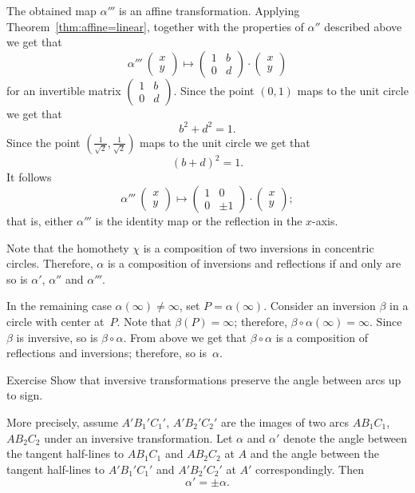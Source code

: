 The obtained map $\alpha'''$ is an affine transformation.
Applying Theorem~\ref{thm:affine=linear}, together with the properties of $\alpha''$ described above we get that
\[\alpha'''\:\left(\begin{smallmatrix}
x\\ y
\end{smallmatrix} \right)
  \mapsto
  \left(\begin{smallmatrix}
1&b\\ 0&d
\end{smallmatrix} \right)
  \cdot
  \left(\begin{smallmatrix}
x\\ y
\end{smallmatrix} \right)
\]
for an invertible matrix $\left(\begin{smallmatrix}
1&b\\ 0&d
\end{smallmatrix} \right)$.
Since the point $(0,1)$ maps to the unit circle we get that 
\[b^2+d^2=1.\]
Since the point $(\tfrac1{\sqrt{2}},\tfrac1{\sqrt{2}})$ maps to the unit circle we get that 
\[(b+d)^2=1.\]
It follows 
\[\alpha'''\:\left(\begin{smallmatrix}
x\\ y
\end{smallmatrix} \right)
  \mapsto
  \left(\begin{smallmatrix}
1&0\\ 0&\pm1
\end{smallmatrix} \right)
\cdot
\left(\begin{smallmatrix}
x
\\ 
y
\end{smallmatrix} \right);
\]
that is, either $\alpha'''$ is the identity map or the reflection in the $x$-axis.

Note that the homothety $\chi$ is a composition of two inversions in concentric circles.
Therefore, $\alpha$ is a composition of inversions and reflections if and only are so is $\alpha'$, $\alpha''$ and $\alpha'''$.

In the remaining case $\alpha(\infty)\ne \infty$, set $P=\alpha(\infty)$.
Consider an inversion $\beta$ in a circle with center at~$P$.
Note that $\beta(P)=\infty$; 
therefore, $\beta\circ\alpha(\infty)=\infty$.
Since $\beta$ is inversive, so is $\beta\circ\alpha$.
From above we get that $\beta\circ\alpha$ is a composition of reflections and inversions;
therefore, so is~$\alpha$.
\qeds

\begin{thm}{Exercise}\label{ex:inversive-angle}
Show that inversive transformations preserve the angle between arcs up to sign.

More precisely, assume $A'B_1'C_1'$, $A'B_2'C_2'$ are the images of two arcs $AB_1C_1$, $AB_2C_2$ under an inversive transformation.
Let $\alpha$ and $\alpha'$ denote the angle between the tangent half-lines to $AB_1C_1$ and $AB_2C_2$ at $A$
and the angle between the tangent half-lines to $A'B_1'C_1'$ and $A'B_2'C_2'$ at $A'$ correspondingly.
Then 
\[\alpha'=\pm \alpha.\]
\end{thm}


